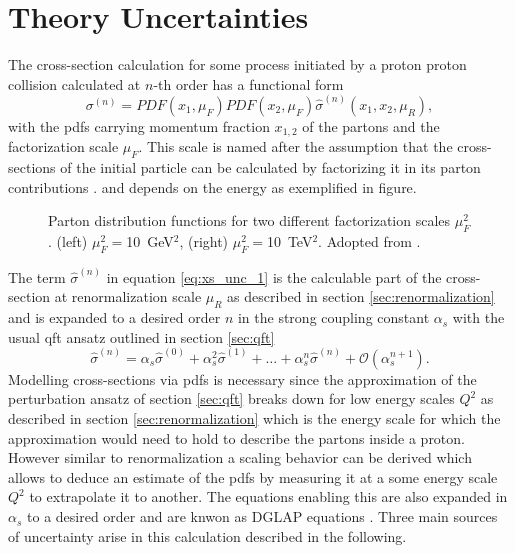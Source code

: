 \section{Theory Uncertainties}
The cross-section calculation for some process initiated by a proton proton collision calculated at $n$-th order has a functional form \citep{unc_recipe}
\begin{equation}
    \sigma^{(n)} = PDF(x_1, \mu_F)  PDF(x_2, \mu_F) \hat{\sigma}^{(n)}(x_1,x_2,\mu_R),
    \label{eq:xs_unc_1}
\end{equation}
with the \acfp{pdf} carrying momentum fraction $x_{1,2}$ of the partons and the factorization scale $\mu_F$. This scale is named after the assumption that the cross-sections of the initial particle can be calculated by factorizing it in its parton contributions \citep{halzen1984introductory}.
 and depends on the energy as exemplified in figure.
\begin{figure}
    \centering
    \caption[]{Parton distribution functions for two different factorization scales $\mu_F^2$. (left) $\mu_F^2=$\qty{10}{GeV}$^2$, (right) $\mu_F^2=$\qty{10}{TeV}$^2$. Adopted from \citep{PhysRevD.98.030001}.}
    \label{fig:}
\end{figure}
The term $\hat{\sigma}^{(n)}$ in equation \ref{eq:xs_unc_1} is the calculable part of the cross-section at renormalization scale $\mu_R$ as described in section \ref{sec:renormalization} and is expanded to a desired order $n$ in the strong coupling constant $\alpha_s$ with the usual \ac{qft} ansatz outlined in section \ref{sec:qft}
\begin{equation}
    \hat{\sigma}^{(n)} = \alpha_s \hat{\sigma}^{(0)} + \alpha_s^2 \hat{\sigma}^{(1)} + \ldots + \alpha_s^n \hat{\sigma}^{(n)} + \mathcal{O}(\alpha_s^{n+1}).
    \label{eq:xs_unc_2}
\end{equation}
Modelling cross-sections via \acp{pdf} is necessary since the approximation of the perturbation ansatz of section \ref{sec:qft} breaks down for low energy scales $Q^2$ as described in section \ref{sec:renormalization} which is the energy scale for which the approximation would need to hold to describe the partons inside a proton. However similar to renormalization a scaling behavior can be derived which allows to deduce an estimate of the \acp{pdf} by measuring it at a some energy scale $Q^2$ to extrapolate it to another. The equations enabling this are also expanded in $\alpha_s$ to a desired order and are knwon as DGLAP equations \citep{halzen1984introductory}. Three main sources of uncertainty arise in this calculation described in the following.

